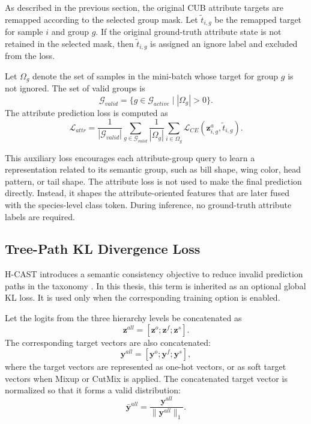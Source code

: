 As described in the previous section, the original CUB attribute targets are remapped according to the selected group mask. Let \(\tilde{t}_{i,g}\) be the remapped target for sample \(i\) and group \(g\). If the original ground-truth attribute state is not retained in the selected mask, then \(\tilde{t}_{i,g}\) is assigned an ignore label and excluded from the loss.

Let \(\Omega_g\) denote the set of samples in the mini-batch whose target for group \(g\) is not ignored. The set of valid groups is
\begin{equation}
    \mathcal{G}_{valid}
    =
    \{g \in \mathcal{G}_{active} \mid |\Omega_g| > 0\}.
\end{equation}
The attribute prediction loss is computed as
\begin{equation}
    \mathcal{L}_{attr}
    =
    \frac{1}{|\mathcal{G}_{valid}|}
    \sum_{g \in \mathcal{G}_{valid}}
    \frac{1}{|\Omega_g|}
    \sum_{i \in \Omega_g}
    \mathcal{L}_{CE}
    \left(
        \mathbf{z}^{a}_{i,g},
        \tilde{t}_{i,g}
    \right).
    \label{eq:attr_loss}
\end{equation}

This auxiliary loss encourages each attribute-group query to learn a representation related to its semantic group, such as bill shape, wing color, head pattern, or tail shape. The attribute loss is not used to make the final prediction directly. Instead, it shapes the attribute-oriented features that are later fused with the species-level class token. During inference, no ground-truth attribute labels are required.

\subsection{Tree-Path KL Divergence Loss}

H-CAST introduces a semantic consistency objective to reduce invalid prediction paths in the taxonomy \cite{park2025visually}. In this thesis, this term is inherited as an optional global KL loss. It is used only when the corresponding training option is enabled.

Let the logits from the three hierarchy levels be concatenated as
\begin{equation}
    \mathbf{z}^{all}
    =
    [\mathbf{z}^{o}; \mathbf{z}^{f}; \mathbf{z}^{s}].
\end{equation}
The corresponding target vectors are also concatenated:
\begin{equation}
    \mathbf{y}^{all}
    =
    [\mathbf{y}^{o}; \mathbf{y}^{f}; \mathbf{y}^{s}],
\end{equation}
where the target vectors are represented as one-hot vectors, or as soft target vectors when Mixup or CutMix is applied. The concatenated target vector is normalized so that it forms a valid distribution:
\begin{equation}
    \bar{\mathbf{y}}^{all}
    =
    \frac{\mathbf{y}^{all}}
    {\|\mathbf{y}^{all}\|_1}.
\end{equation}

